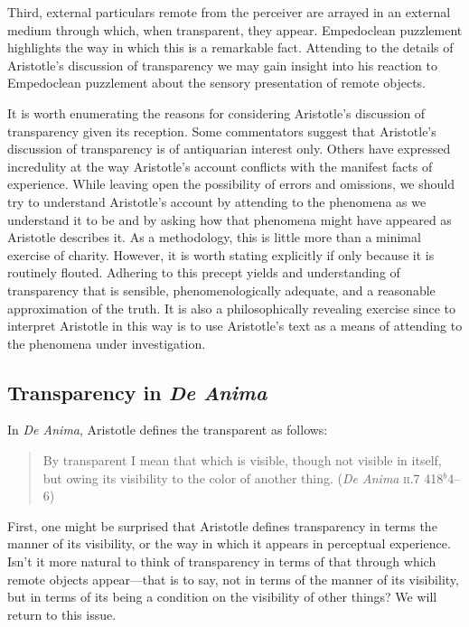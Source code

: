 \documentclass[12pt]{article}
\begin{document}
Third, external particulars remote from the perceiver are arrayed in an external medium through which, when transparent, they appear. Empedoclean puzzlement highlights the way in which this is a remarkable fact. Attending to the details of Aristotle's discussion of transparency we may gain insight into his reaction to Empedoclean puzzlement about the sensory presentation of remote objects.

It is worth enumerating the reasons for considering Aristotle's discussion of transparency given its reception. Some commentators suggest that Aristotle's discussion of transparency is of antiquarian interest only. Others have expressed incredulity at the way Aristotle's account conflicts with the manifest facts of experience. While leaving open the possibility of errors and omissions, we should try to understand Aristotle's account by attending to the phenomena as we understand it to be and by asking how that phenomena might have appeared as Aristotle describes it. As a methodology, this is little more than a minimal exercise of charity. However, it is worth stating explicitly if only because it is routinely flouted. Adhering to this precept yields and understanding of transparency that is sensible, phenomenologically adequate, and a reasonable approximation of the truth. It is also a philosophically revealing exercise since to interpret Aristotle in this way is to use Aristotle's text as a means of attending to the phenomena under investigation.

\subsection{Transparency in \emph{De Anima}} %
\label{sub:transparency_in_de_anima}

In \emph{De Anima}, Aristotle defines the transparent as follows:
\begin{quote}
	By transparent I mean that which is visible, though not visible in itself, but owing its visibility to the color of another thing. (\emph{De Anima} \textsc{ii}.7 418\( ^{b} \)4--6)
\end{quote}

First, one might be surprised that Aristotle defines transparency in terms the manner of its visibility, or the way in which it appears in perceptual experience. Isn't it more natural to think of transparency in terms of that through which remote objects appear---that is to say, not in terms of the manner of its visibility, but in terms of its being a condition on the visibility of other things? We will return to this issue.
\end{document}
